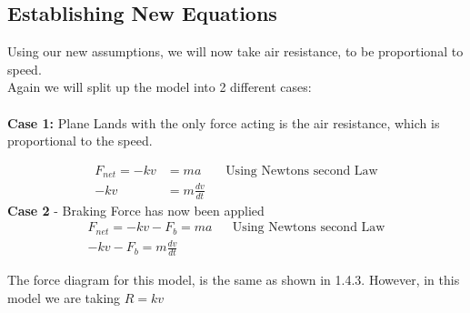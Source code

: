 \subsection{Establishing New Equations}
Using our new assumptions, we will now take air resistance, to be proportional to speed.
\\
Again we will split up the model into 2 different cases:
\\ \\
\textbf{Case 1: }Plane Lands with the only force acting is the air resistance, which is proportional to the speed.

\begin{align*}
    F_{net} = -kv &= ma && \text{Using Newtons second Law}
    \\ -kv &= m \frac{dv}{dt}
\end{align*}
\textbf{Case 2} - Braking Force has now been applied
\begin{align*}
    F_{net} = -kv - F_b = ma && \text{Using Newtons second Law}
    \\ -kv - F_b = m \frac{dv}{dt}
\end{align*}

The force diagram for this model, is the same as shown in 1.4.3. However, in this model we are taking $R = kv $